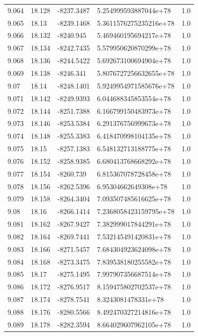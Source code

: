 \begin{tabular}{lllll}
9.064 & 18.128 & -8237.3487 & 5.254999593887044e+78 & 1.0 \\
9.065 & 18.13 & -8239.1468 & 5.3611576275235216e+78 & 1.0 \\
9.066 & 18.132 & -8240.945 & 5.469460195694217e+78 & 1.0 \\
9.067 & 18.134 & -8242.7435 & 5.579950620870299e+78 & 1.0 \\
9.068 & 18.136 & -8244.5422 & 5.692673100694904e+78 & 1.0 \\
9.069 & 18.138 & -8246.341 & 5.8076727256632655e+78 & 1.0 \\
9.07 & 18.14 & -8248.1401 & 5.9249954971585676e+78 & 1.0 \\
9.071 & 18.142 & -8249.9393 & 6.044688345853554e+78 & 1.0 \\
9.072 & 18.144 & -8251.7388 & 6.166799150483973e+78 & 1.0 \\
9.073 & 18.146 & -8253.5384 & 6.291376756999673e+78 & 1.0 \\
9.074 & 18.148 & -8255.3383 & 6.418470998104135e+78 & 1.0 \\
9.075 & 18.15 & -8257.1383 & 6.548132713188775e+78 & 1.0 \\
9.076 & 18.152 & -8258.9385 & 6.680413768668292e+78 & 1.0 \\
9.077 & 18.154 & -8260.739 & 6.815367078728458e+78 & 1.0 \\
9.078 & 18.156 & -8262.5396 & 6.95304662649308e+78 & 1.0 \\
9.079 & 18.158 & -8264.3404 & 7.093507485616625e+78 & 1.0 \\
9.08 & 18.16 & -8266.1414 & 7.2368058423159795e+78 & 1.0 \\
9.081 & 18.162 & -8267.9427 & 7.382999017844291e+78 & 1.0 \\
9.082 & 18.164 & -8269.7441 & 7.532145491420831e+78 & 1.0 \\
9.083 & 18.166 & -8271.5457 & 7.684304923624098e+78 & 1.0 \\
9.084 & 18.168 & -8273.3475 & 7.839538180255582e+78 & 1.0 \\
9.085 & 18.17 & -8275.1495 & 7.997907356687514e+78 & 1.0 \\
9.086 & 18.172 & -8276.9517 & 8.159475802702537e+78 & 1.0 \\
9.087 & 18.174 & -8278.7541 & 8.3243081478331e+78 & 1.0 \\
9.088 & 18.176 & -8280.5566 & 8.492470327214816e+78 & 1.0 \\
9.089 & 18.178 & -8282.3594 & 8.664029607962105e+78 & 1.0 \\

\end{tabular}
